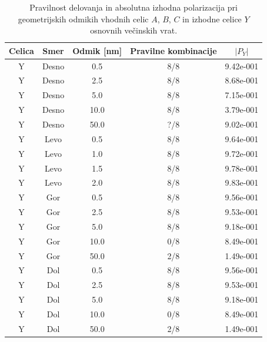 \documentclass[12pt,a4paper]{article}
\begin{document}
\begin{table}[H]
\begin{minipage}{0.49\textwidth}
{\begin{tabular}{|c|c|c|c|c|}
                \hline
                Celica & Smer & Odmik [nm] & Pravilne kombinacije & $|P_Y|$ \\
                \hline
                Y & Desno & 0.5 & 8/8 & 9.42e-001 \\
                Y & Desno & 2.5 & 8/8 & 8.68e-001 \\
                Y & Desno & 5.0 & 8/8 & 7.15e-001 \\
                Y & Desno & 10.0 & 8/8 & 3.79e-001 \\
                Y & Desno & 50.0 & ?/8 & 9.02e-001 \\
                Y & Levo & 0.5 & 8/8 & 9.64e-001 \\
                Y & Levo & 1.0 & 8/8 & 9.72e-001 \\
                Y & Levo & 1.5 & 8/8 & 9.78e-001 \\
                Y & Levo & 2.0 & 8/8 & 9.83e-001 \\
                Y & Gor & 0.5 & 8/8 & 9.56e-001 \\
                Y & Gor & 2.5 & 8/8 & 9.53e-001 \\
                Y & Gor & 5.0 & 8/8 & 9.18e-001 \\
                Y & Gor & 10.0 & 0/8 & 8.49e-001 \\
                Y & Gor & 50.0 & 2/8 & 1.49e-001 \\
                Y & Dol & 0.5 & 8/8 & 9.56e-001 \\
                Y & Dol & 2.5 & 8/8 & 9.53e-001 \\
                Y & Dol & 5.0 & 8/8 & 9.18e-001 \\
                Y & Dol & 10.0 & 0/8 & 8.49e-001 \\
                Y & Dol & 50.0 & 2/8 & 1.49e-001 \\
                \hline
            \end{tabular}
        }
    \end{minipage}

    \caption{Pravilnost delovanja in absolutna izhodna polarizacija pri geometrijskih odmikih vhodnih celic $A$, $B$, $C$ in izhodne celice $Y$ osnovnih večinskih vrat.}
    \label{g18:tab:osnovna-io}
\end{table}
\end{document}
